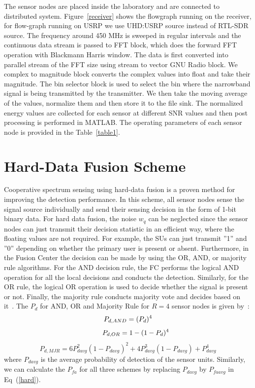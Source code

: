 The sensor nodes are placed inside the laboratory and are connected to distributed system. Figure~\ref{receiver} shows the flowgraph running on the receiver, for flow-graph running on USRP we use UHD:USRP source instead of RTL-SDR source. The frequency around 450 MHz is sweeped in regular intervals and the continuous data stream is passed to FFT block, which does the forward FFT operation with Blackmann Harris window. The data is first converted into parallel stream of the FFT size using stream to vector GNU Radio block. We complex to magnitude block converts the complex values into float and take their magnitude. The bin selector block is used to select the bin where the narrowband signal is being transmitted by the transmitter. We then take the moving average of the values, normalize them and then store it to the file sink. The normalized energy values are collected for each sensor at different SNR values and then post processing is performed in MATLAB. The operating parameters of each sensor node is provided in the Table~\ref{table1}.

\section{Hard-Data Fusion Scheme}
\label{hardfusion}
Cooperative spectrum sensing using hard-data fusion is a proven method for improving the detection performance. In this scheme, all sensor nodes sense the signal source individually and send their sensing decision in the form of 1-bit binary data. For hard data fusion, the noise $w_q$ can be neglected since the sensor nodes can just transmit their decision statistic in an efficient way, where the floating values are not required. For example, the SUs can just transmit ''1'' and ''0'' depending on whether the primary user is present or absent. Furthermore, in the Fusion Center the decision can be made by using the OR, AND, or majority rule algorithms. For the AND decision rule, the FC performs the logical AND operation for all the local decisions and conducts the detection. Similarly, for the OR rule, the logical OR operation is used to decide whether the signal is present or not. Finally, the majority rule conducts majority vote and decides based on it~\cite{ghasemi2005collaborative,duan2010performance}. The $P_d$ for AND, OR and Majority Rule for $R=4$ sensor nodes is given by~\cite{inphtn15}:
\begin{equation}
P_{d,AND} = (P_d)^4\nonumber\\
\vspace{-15pt}
\end{equation}
\begin{equation}
\label{hard}
~~~~~~~P_{d,OR} = 1-(1-P_d)^4
\vspace{-15pt}
\end{equation}
\begin{equation}
P_{d,MJR} = 6P_{davg}^2(1-P_{davg})^2+4P_{davg}^3(1-P_{davg})+P_{davg}^4\nonumber
\end{equation}
where $P_{davg}$ is the average probability of detection of the sensor units. Similarly, we can calculate the $P_{fa}$ for all three schemes by replacing $P_{davg}$ by $P_{faavg}$ in Eq~(\ref{hard}).

